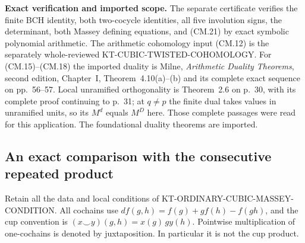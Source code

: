 \documentclass[11pt,a4paper]{article}
\theoremstyle{definition}
\renewcommand{\paragraph}[1]{\par\smallskip\noindent\textbf{#1}\quad\ignorespaces}
\begin{document}
\paragraph{Exact verification and imported scope.}
The separate certificate
 verifies the finite BCH
identity, both two-cocycle identities, all five involution
signs, the determinant, both Massey defining equations,
and (CM.21) by exact symbolic polynomial arithmetic.
The arithmetic cohomology input (CM.12) is the separately
whole-reviewed KT-CUBIC-TWISTED-COHOMOLOGY.
For (CM.15)--(CM.18) the imported duality is Milne,
\emph{Arithmetic Duality Theorems}, second edition,
Chapter~I, Theorem~4.10(a)--(b) and its complete exact
sequence on pp.~56--57.  Local unramified orthogonality
is Theorem~2.6 on p.~30, with its complete proof continuing
to p.~31; at $q\ne p$ the finite dual takes values in
unramified units, so its $M^d$ equals $M^D$ here.
Those complete passages were read for this application.
The foundational duality theorems are imported.



\subsection{An exact comparison with the consecutive repeated product}
\label{sec:kt-cubic-shuffle}

Retain all the data and local conditions of
KT-ORDINARY-CUBIC-MASSEY-CONDITION.  All cochains use
\(df(g,h)=f(g)+g f(h)-f(gh)\), and the cup convention is
\((x\smile y)(g,h)=x(g)\,g y(h)\).
Pointwise multiplication of one-cochains is denoted by
juxtaposition.  In particular it is not the cup product.
\end{document}
